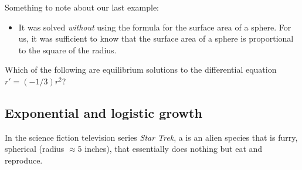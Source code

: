 \documentclass{ximera}
\begin{document}
Something to note about our last example:
\begin{itemize}
\item It was solved \textit{without} using the formula for the surface area
of a sphere. For us, it was sufficient to know that the surface area
of a sphere is proportional to the square of the radius.
\end{itemize}
\begin{question}
  Which of the following are equilibrium solutions to the differential equation $r'=(-1/3)r^2$?
  \begin{multipleChoice}
  \end{multipleChoice}
\end{question}





\subsection{Exponential and logistic growth}

In the science fiction television series \textit{Star
  Trek}, a  is an alien species that is furry, spherical
(radius $\approx 5$ inches), that essentially does nothing but eat and
reproduce. 
\end{document}
